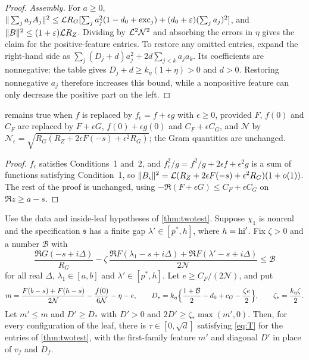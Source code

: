 \begin{proof}
\emph{Assembly.} For $a\ge0$,
$\|\sum_ja_jA_j\|^2\le\mathcal{L} R_G[\sum_ja_j^2(1-d_0+\mathrm{exc}_j)+(d_0+\varepsilon)(\sum_ja_j)^2]$, and
$\|B\|^2\le(1+\varepsilon)\mathcal{L} R_Z$. Dividing by $\mathcal{L}^2\mathcal N^2$ and absorbing the errors in $\eta$ gives the claim
for the positive-feature entries. To restore any omitted entries, expand the
right-hand side as
$\sum_j(D_j+d)a_j^2+2d\sum_{j<k}a_ja_k$. Its coefficients are nonnegative:
the table gives $D_j+d\ge k_\eta(1+\eta)>0$ and $d>0$.
Restoring nonnegative $a_j$ therefore increases this bound, while a nonpositive feature
can only decrease the positive part on the left.
\end{proof}

\begin{proposition}\label{prop:mixture}
 remains true when $f$ is replaced by $f_\epsilon=f+\epsilon g$ with $\epsilon\ge0$, provided
$F$, $f(0)$ and $C_F$ are replaced by $F+\epsilon G$, $f(0)+\epsilon g(0)$ and $C_F+\epsilon C_G$, and $\mathcal N$ by
$\mathcal N_\epsilon=\sqrt{R_G(R_Z+2\epsilon F(-s)+\epsilon^2R_G)}$; the Gram quantities are unchanged.
\end{proposition}

\begin{proof}
$f_\epsilon$ satisfies Conditions~1 and~2, and $f_\epsilon^2/g=f^2/g+2\epsilon f+\epsilon^2g$ is a sum of functions
satisfying Condition~1, so $\|B_\epsilon\|^2=\mathcal{L}(R_Z+2\epsilon F(-s)+\epsilon^2R_G)(1+o(1))$. The rest of the proof
is unchanged, using $-\Re(F+\epsilon G)\le C_F+\epsilon C_G$ on $\Re z\ge a-s$.
\end{proof}

\begin{proposition}\label{prop:paired}
Use the data and inside-leaf hypotheses of \cref{thm:twotest}. Suppose $\chi_1$ is
nonreal and the specification $\mathfrak s$ has a finite gap
$\lambda'\in[p^*,h]$, where $h=\mathrm{hi}'$. Fix $\zeta>0$ and
a number $\mathcal B$ with
\begin{equation}\label{eq:pairB}
  \frac{\Re G(-s+i\Delta)}{R_G}-\zeta\,\frac{\Re F(\lambda_1-s+i\Delta)+\Re F(\lambda'-s+i\Delta)}{2\mathcal N}\le\mathcal B
\end{equation}
for all real $\Delta$, $\lambda_1\in[a,b]$ and $\lambda'\in[p^*,h]$. Let $e\ge C_F/(2\mathcal N)$, and put
\[
  m=\frac{F(b-s)+F(h-s)}{2\mathcal N}-\frac{f(0)}{6\mathcal N}-\eta-e,\qquad
  D_*=k_\eta\Bigl\{\frac{1+\mathcal B}2-d_0+c_G-\frac{\zeta e}2\Bigr\},\qquad\zeta_*=\frac{k_\eta\zeta}2 .
\]
Let $m'\le m$ and $D'\ge D_*$ with $D'>0$ and $2D'\ge\zeta_*\max(m',0)$. Then, for every configuration
of the leaf, there is $\tau\in[0,\sqrt d]$ satisfying \eqref{eq:T} for the entries of \cref{thm:twotest},
with the first-family feature $m'$ and diagonal $D'$ in place of $v_f$ and $D_f$.
\end{proposition}

